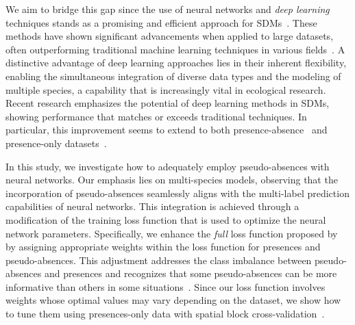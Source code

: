 \documentclass[3p,preprint,12pt]{elsarticle}
\begin{document}
We aim to bridge this gap since the use of neural networks and \textit{deep learning} techniques stands as a promising and efficient approach for SDMs~\citep{teng2023satbird, botella2023geolifeclef2023, davis2023deep}. These methods have shown significant advancements when applied to large datasets, often outperforming traditional machine learning techniques in various fields~\citep{krizhevsky2012imagenet, christin2019applications, brown2020gpt3, Jumper2021alphafold2}. A distinctive advantage of deep learning approaches lies in their inherent flexibility, enabling the simultaneous integration of diverse data types and the modeling of multiple species, a capability that is increasingly vital in ecological research. Recent research emphasizes the potential of deep learning methods in SDMs, showing performance that matches or exceeds traditional techniques. In particular, this improvement seems to extend to both presence-absence~\citep{chen2017, teng2023satbird} and presence-only datasets~\citep{deneu2021convolutional, botella2023geolifeclef2023}.

In this study, we investigate how to adequately employ pseudo-absences with neural networks. Our emphasis lies on multi-species models, observing that the incorporation of pseudo-absences seamlessly aligns with the multi-label prediction capabilities of neural networks. This integration is achieved through a modification of the training loss function that is used to optimize the neural network parameters.
Specifically, we enhance the \textit{full} loss function proposed by~\cite{cole2023spatial} by assigning appropriate weights within the loss function for presences and pseudo-absences. This adjustment addresses the class imbalance between pseudo-absences and presences and recognizes that some pseudo-absences can be more informative than others in some situations~\citep{phillips2009sample}.
Since our loss function involves weights whose optimal values may vary depending on the dataset, we show how to tune them using presences-only data with spatial block cross-validation~\citep{roberts2017cross}.
\end{document}
